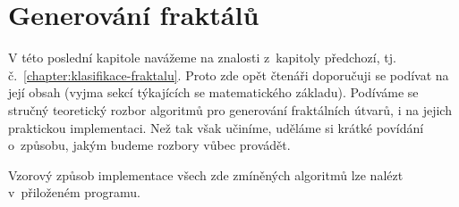 \chapter{Generování fraktálů}\label{chapter:generovani-fraktalu}

V této poslední kapitole navážeme na znalosti z~kapitoly předchozí, tj. č.~\ref{chapter:klasifikace-fraktalu}. Proto zde opět čtenáři doporučuji se podívat na její obsah (vyjma sekcí týkajících se matematického základu). Podíváme se stručný teoretický rozbor algoritmů pro generování fraktálních útvarů, i na jejich praktickou implementaci. Než tak však učiníme, uděláme si krátké povídání o~způsobu, jakým budeme rozbory vůbec provádět.

Vzorový způsob implementace všech zde zmíněných algoritmů lze nalézt v~přiloženém programu.




